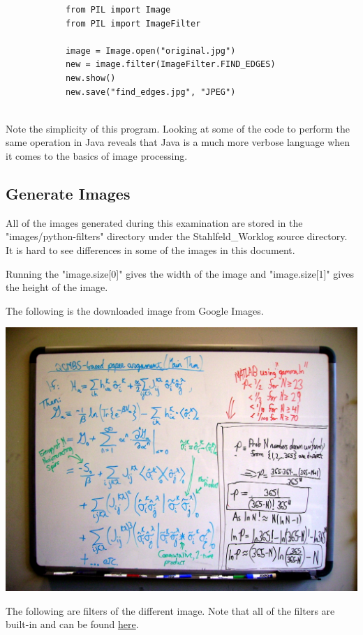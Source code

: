 \documentclass[]{article}
\begin{document}
			\begin{verbatim}
			from PIL import Image
			from PIL import ImageFilter
			
			image = Image.open("original.jpg")
			new = image.filter(ImageFilter.FIND_EDGES)
			new.show()
			new.save("find_edges.jpg", "JPEG")
			
			\end{verbatim}
			
			Note the simplicity of this program. Looking at some of the code to perform the same operation in Java reveals that Java is a much more verbose language when it comes to the basics of image processing.
		
		\subsection{Generate Images}
			All of the images generated during this examination are stored in the "images/python-filters" directory under the Stahlfeld\_Worklog source directory. It is hard to see differences in some of the images in this document.
		
			Running the "image.size[0]" gives the width of the image and "image.size[1]" gives the height of the image.
			
			The following is the downloaded image from Google Images.
			
			\includegraphics{images/python-filters/original.jpg}
			
			The following are filters of the different image. Note that all of the filters are built-in and can be found \href{http://www.pythonware.com/library/pil/handbook/imagefilter.htm}{here}.
			
\end{document}
